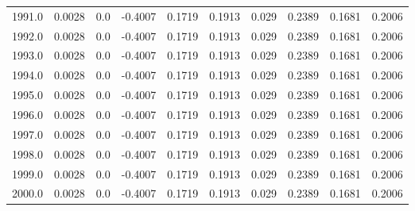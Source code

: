 \begin{longtable}{lrrrrrrrrr}
1991.0 & 0.0028 & 0.0 & -0.4007 & 0.1719 & 0.1913 & 0.029 & 0.2389 & 0.1681 & 0.2006 \\
1992.0 & 0.0028 & 0.0 & -0.4007 & 0.1719 & 0.1913 & 0.029 & 0.2389 & 0.1681 & 0.2006 \\
1993.0 & 0.0028 & 0.0 & -0.4007 & 0.1719 & 0.1913 & 0.029 & 0.2389 & 0.1681 & 0.2006 \\
1994.0 & 0.0028 & 0.0 & -0.4007 & 0.1719 & 0.1913 & 0.029 & 0.2389 & 0.1681 & 0.2006 \\
1995.0 & 0.0028 & 0.0 & -0.4007 & 0.1719 & 0.1913 & 0.029 & 0.2389 & 0.1681 & 0.2006 \\
1996.0 & 0.0028 & 0.0 & -0.4007 & 0.1719 & 0.1913 & 0.029 & 0.2389 & 0.1681 & 0.2006 \\
1997.0 & 0.0028 & 0.0 & -0.4007 & 0.1719 & 0.1913 & 0.029 & 0.2389 & 0.1681 & 0.2006 \\
1998.0 & 0.0028 & 0.0 & -0.4007 & 0.1719 & 0.1913 & 0.029 & 0.2389 & 0.1681 & 0.2006 \\
1999.0 & 0.0028 & 0.0 & -0.4007 & 0.1719 & 0.1913 & 0.029 & 0.2389 & 0.1681 & 0.2006 \\
2000.0 & 0.0028 & 0.0 & -0.4007 & 0.1719 & 0.1913 & 0.029 & 0.2389 & 0.1681 & 0.2006 \\
\end{longtable}